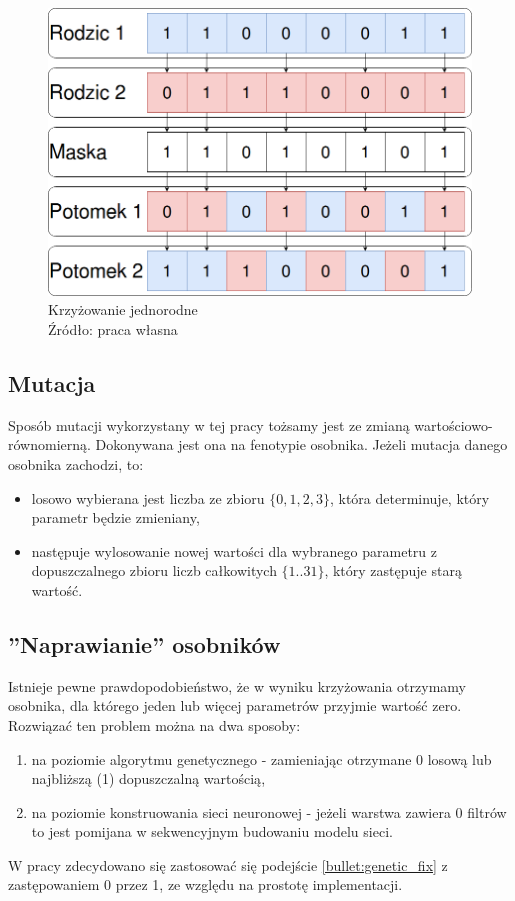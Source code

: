 \begin{figure}[h!tb]
	 \centering
	 \includegraphics[width = 1.0\linewidth]{img/crossing}
	 \caption{Krzyżowanie jednorodne \\
              Źródło: praca własna}
	 \label{fig:crossing}
\end{figure}

\subsection{Mutacja}
Sposób mutacji wykorzystany w tej pracy tożsamy jest ze zmianą wartościowo-równomierną.
Dokonywana jest ona na fenotypie osobnika.
Jeżeli mutacja danego osobnika zachodzi, to:
\begin{itemize}
  \item losowo wybierana jest liczba ze zbioru $\lbrace 0, 1, 2, 3 \rbrace$, która determinuje, który parametr będzie zmieniany,
  \item następuje wylosowanie nowej wartości dla wybranego parametru z dopuszczalnego zbioru liczb całkowitych $\lbrace 1..31 \rbrace$, który zastępuje starą wartość.
\end{itemize}

\subsection{''Naprawianie'' osobników}\label{sec:individual_fix}
Istnieje pewne prawdopodobieństwo, że w wyniku krzyżowania otrzymamy osobnika, dla którego jeden lub więcej parametrów przyjmie wartość zero.
Rozwiązać ten problem można na dwa sposoby:
\begin{enumerate}
  \item na poziomie algorytmu genetycznego - zamieniając otrzymane 0 losową lub najbliższą (1) dopuszczalną wartością\label{bullet:genetic_fix},
  \item na poziomie konstruowania sieci neuronowej - jeżeli warstwa zawiera 0 filtrów to jest pomijana w sekwencyjnym budowaniu modelu sieci.
\end{enumerate}
W pracy zdecydowano się zastosować się podejście \ref{bullet:genetic_fix} z zastępowaniem 0 przez 1, ze względu na prostotę implementacji.

